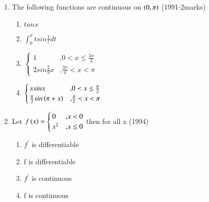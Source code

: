 \documentclass[journal]{IEEEtran}
\numberwithin{equation}{enumi}
\numberwithin{figure}{enumi}
\begin{document}
\begin{enumerate}
\begin{enumerate}
			\end{enumerate}
		\item The following functions are continuous on $\left(0,\pi\right)$ \hfill{(1991-2marks)}
			\begin{enumerate}
				\item $tanx$
				\item $\int_{0}^{x}tsin\frac{1}{t}dt$ 
				\item $\begin{cases} 1 & \text{,} 0<x\leq\frac{3\pi}{4} \\
						2sin\frac{2}{9}x & \text{,} \frac{3\pi}{4}<x<\pi \end{cases}$
				\item $\begin{cases} xsinx & \text{,} 0<x\leq\frac{\pi}{2} \\ \frac{\pi}{2}sin\left(\pi+x\right) & \text{,} \frac{\pi}{2}<x<\pi \end{cases}$
			\end{enumerate}
		\item Let $f\left(x\right)=\begin{cases} 0 & \text{,} x<0 \\
                             x^2 & \text{,} x\leq0 \end{cases}$ then for all x \hfill{(1994)}
			     \begin{enumerate}
				     \item $f^\prime$ is differentiable
				     \item f is differentiable
				     \item $f^\prime$ is continuous
				     \item f is continuous
			     \end{enumerate}


\end{enumerate}
\end{document}
